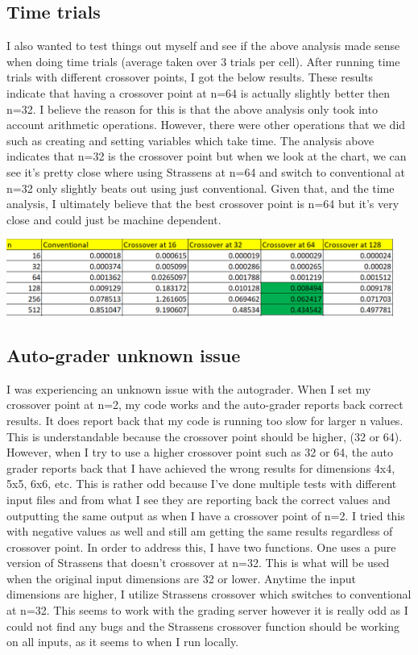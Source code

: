 \documentclass{amsart}
\theoremstyle{definition}
\theoremstyle{remark}
\begin{document}
\subsection{Time trials} 
I also wanted to test things out myself and see if the above analysis made sense when doing time trials (average taken over 3 trials per cell). After running time trials with different crossover points, I got the below results. These results indicate that having a crossover point at n=64 is actually slightly better then n=32. I believe the reason for this is that the above analysis only took into account arithmetic operations. However, there were other operations that we did such as creating and setting variables which take time. The analysis above indicates that n=32 is the crossover point but when we look at the chart, we can see it's pretty close where using Strassens at n=64 and switch to conventional at n=32 only slightly beats out using just conventional. Given that, and the time analysis, I ultimately believe that the best crossover point is n=64 but it's very close and could just be machine dependent. \break

            \includegraphics[width = 5in]{time.png} 
            
\subsection{Auto-grader unknown issue} 
I was experiencing an unknown issue with the autograder. When I set my crossover point at n=2, my code works and the auto-grader reports back correct results. It does report back that my code is running too slow for larger n values. This is understandable because the crossover point should be higher, (32 or 64). However, when I try to use a higher crossover point such as 32 or 64, the auto grader reports back that I have achieved the wrong results for dimensions 4x4, 5x5, 6x6, etc. This is rather odd because I've done multiple tests with different input files and from what I see they are reporting back the correct values and outputting the same output as when I have a crossover point of n=2. I tried this with negative values as well and still am getting the same results regardless of crossover point. 
In order to address this, I have two functions. One uses a pure version of Strassens that doesn't crossover at n=32. This is what will be used when the original input dimensions are 32 or lower. Anytime the input dimensions are higher, I utilize Strassens crossover which switches to conventional at n=32. This seems to work with the grading server however it is really odd as I could not find any bugs and the Strassens crossover function should be working on all inputs, as it seems to when I run locally.
            
\end{document}
